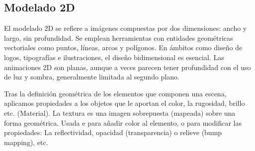 \subsection{Modelado 2D}

El modelado 2D se refiere a imágenes compuestas por dos dimensiones: ancho y largo, sin profundidad. Se emplean herramientas con entidades geométricas vectoriales como puntos, líneas, arcos y polígonos. En ámbitos como diseño de logos, tipografías e ilustraciones, el diseño bidimensional es esencial. Las animaciones 2D son planas, aunque a veces parecen tener profundidad con el uso de luz y sombra, generalmente limitada al segundo plano.

Tras la definición geométrica de los elementos que componen una escena, aplicamos
propiedades a los objetos que le aportan el color, la rugosidad, brillo etc. (Material).
La textura es una imagen sobrepuesta (mapeada) sobre una forma geométrica. Usada e
para añadir color al elemento, o para modificar las propiedades: La reflectividad, opacidad
(transparencia) o relieve (bump mapping), etc.

